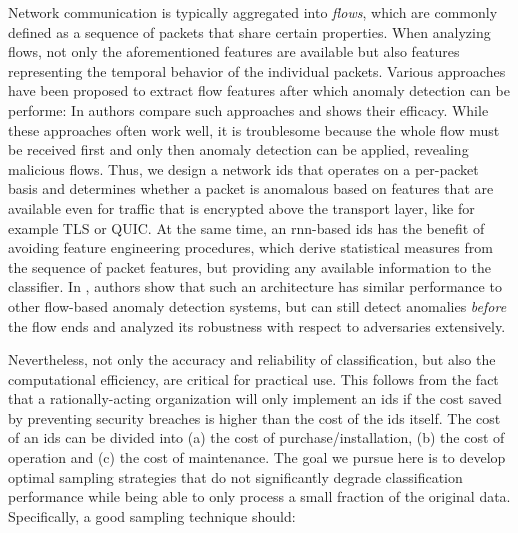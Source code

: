 \documentclass[conference]{IEEEtran}
\begin{document}
Network communication is typically aggregated into \textit{flows}, which are commonly defined as a sequence of packets that share certain properties. When analyzing flows, not only the aforementioned features are available but also features representing the temporal behavior of the individual packets. Various approaches have been proposed to extract flow features after which anomaly detection can be performe: In \cite{meghdouri_analysis_2018} authors compare such approaches and shows their efficacy.
While these approaches often work well, it is troublesome because the whole flow must be received first and only then anomaly detection can be applied, revealing malicious flows. Thus, we design a network \gls{ids} that operates on a per-packet basis and determines whether a packet is anomalous based on features that are available even for traffic that is encrypted above the transport layer, like for example TLS or QUIC.
At the same time, an \gls{rnn}-based \gls{ids} has the benefit of avoiding feature engineering procedures, which derive statistical measures from the sequence of packet features, but providing any available information to the classifier.
In \cite{hartl_explainability_2019}, authors show that such an architecture has similar performance to other flow-based anomaly detection systems, but can still detect anomalies \textit{before} the flow ends and analyzed its robustness with respect to adversaries extensively.


Nevertheless, not only the accuracy and reliability of classification, but also the computational efficiency, are critical for practical use. This follows from the fact that a rationally-acting organization will only implement an \gls{ids} if the cost saved by preventing security breaches is higher than the cost of the \gls{ids} itself. The cost of an \gls{ids} can be divided into (a) the cost of purchase/installation, (b) the cost of operation and (c) the cost of maintenance. The goal we pursue here is to develop optimal sampling strategies that do not significantly degrade classification performance while being able to only process a small fraction of the original data. Specifically, a good sampling technique should:
\end{document}
